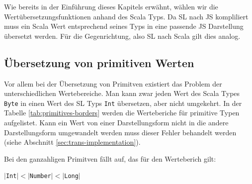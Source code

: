 \documentclass[12pt]{scrreprt}
\begin{document}
Wie bereits in der Einführung dieses Kapitels erwähnt, wählen wir die Wertübersetzungsfunktionen anhand des Scala Typs. Da \ac{SL} nach \ac{JS} kompliliert muss ein Scala Wert entsprechend seines Typs in eine passende \ac{JS} Darstellung übersetzt werden. Für die Gegenrichtung, also \ac{SL} nach Scala gilt dies analog. 

\subsection{Übersetzung von primitiven Werten}

Vor allem bei der Übersetzung von Primitven existiert das Problem der unterschiedlichen Wertebereiche. Man kann zwar jeden Wert des Scala Types \lstinline!Byte! in einen Wert des \ac{SL} Typs \lstinline!Int! übersetzen, aber nicht umgekehrt. In der Tabelle \ref{tab:primitives-borders} werden die Werteberiche für primitive Typen aufgelistet. Kann ein Wert von einer Darstellungsform nicht in die andere Darstellungsform umgewandelt werden muss dieser Fehler behandelt werden (siehe Abschnitt \ref{sec:trans-implementation}). 

Bei den ganzahligen Primitven fällt auf, das für den Werteberich gilt:
\begin{center}
$|$\lstinline!Int!$| < |$\lstinline!Number!$| < |$\lstinline!Long!$|$
\end{center}
\end{document}

